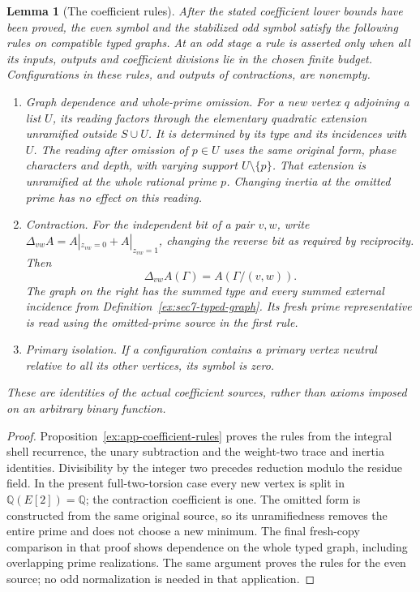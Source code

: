 \documentclass[11pt]{article}
\newtheorem{lemma}[theorem]{Lemma}
\theoremstyle{definition}
\theoremstyle{remark}
\newcommand{\Q}{\mathbb Q}
\begin{document}
\begin{lemma}[The coefficient rules]\label{ex:sec7-coefficient-rules}
After the stated coefficient lower bounds have been proved, the even
symbol and the stabilized odd symbol satisfy the following rules on
compatible typed graphs. At an odd stage a rule is asserted only when
all its inputs, outputs and coefficient divisions lie in the chosen
finite budget. Configurations in these rules, and outputs of
contractions, are nonempty.
\begin{enumerate}
\item \emph{Graph dependence and whole-prime omission.}
For a new vertex $q$ adjoining a list $U$, its reading factors through
the elementary quadratic extension unramified outside $S\cup U$.
It is determined by its type and its incidences with $U$.
The reading after omission of $p\in U$ uses the same original form,
phase characters and depth, with varying support
$U\setminus\{p\}$. That extension is unramified at the whole
rational prime $p$. Changing inertia at the omitted prime has no
effect on this reading.
\item \emph{Contraction.}
For the independent bit of a pair $v,w$, write
$\Delta_{vw}A=A|_{z_{vw}=0}+A|_{z_{vw}=1}$, changing the reverse bit
as required by reciprocity. Then
\[
                 \Delta_{vw}A(\Gamma)=A(\Gamma/(v,w)).
\]
The graph on the right has the summed type and \emph{every} summed
external incidence from Definition~\ref{ex:sec7-typed-graph}. Its
fresh prime representative is read using the omitted-prime source
in the first rule.
\item \emph{Primary isolation.}
If a configuration contains a primary vertex neutral relative to
all its other vertices, its symbol is zero.
\end{enumerate}
These are identities of the actual coefficient sources, rather than
axioms imposed on an arbitrary binary function.
\end{lemma}
\begin{proof}\leavevmode
Proposition~\ref{ex:app-coefficient-rules} proves the rules from the
integral shell recurrence, the unary subtraction and the weight-two
trace and inertia identities. Divisibility by the integer two precedes
reduction modulo the residue field. In the present full-two-torsion
case every new vertex is split in $\Q(E[2])=\Q$; the contraction
coefficient is one. The omitted form is constructed from the same
original source, so its unramifiedness removes the entire prime and
does not choose a new minimum. The final fresh-copy comparison in that
proof shows dependence on the whole typed graph, including overlapping
prime realizations. The same argument proves the rules for the
even source; no odd normalization is needed in that application.
\end{proof}
\end{document}
